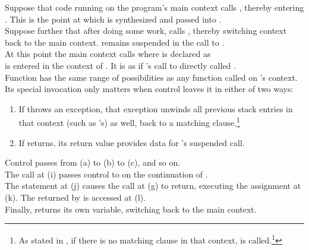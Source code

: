 Suppose that code running on the program's main context calls ,
thereby entering . This is the point at which  is synthesized
and passed into .\\
Suppose further that after doing some work,  calls ,
thereby switching context back to the main context.  remains suspended
in the call to .\\
At this point the main context calls 
where  is declared as\\
  is entered in the context of .
It is as if 's call to  directly called .\\
Function  has the same range of possibilities as any function called on
's context. Its special invocation only matters when control leaves it
in either of two ways:

\begin{enumerate}
  \item If  throws an exception, that exception unwinds all previous
        stack entries in that context (such as 's) as well, back to a
        matching  clause.\footnote{As stated in ,
        if there is no matching  clause in that context,
         is called.\footnote{There are only two ways to
        terminate a given context without terminating the whole process. One
        is to switch to some context that will destroy the continuation passed
        (or returned) to it. The other is to return a valid continuation from
        the \entryfn. If an  function throws an
        exception, it is good practice to bind into the exception object
        the continuation passed into the  function so that
        a  clause in the \entryfn can return that continuation.}}
  \item If  returns, its return value provides data for
        's suspended  call.
\end{enumerate}


Control passes from (a) to (b) to (c), and so on.\\
The  call at (i) passes control
to  on the continuation of .\\
The  statement at (j) causes the \resume call at (g) to return,
executing the assignment at (k). The  returned by  is
accessed at (l).\\
Finally,  returns its own  variable, switching back to the main
context.


